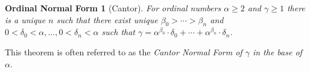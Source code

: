 \documentclass[12pt]{article}
\begin{document}
\newtheorem*{thm}{Ordinal Normal Form}
\begin{thm}[Cantor]
For ordinal numbers $\alpha\geq 2$ and $\gamma\geq 1$ there is a unique $n$ such that there exist unique $\beta_0>\cdots>\beta_n$ and $0<\delta_0<\alpha,\ldots,0<\delta_n<\alpha$ such that $\gamma=\alpha^{\beta_0}\cdot\delta_0+\cdots+\alpha^{\beta_n}\cdot\delta_n$.
\end{thm}

This theorem is often referred to as the \emph{Cantor Normal Form of $\gamma$ in the base of $\alpha$}.
\end{document}
